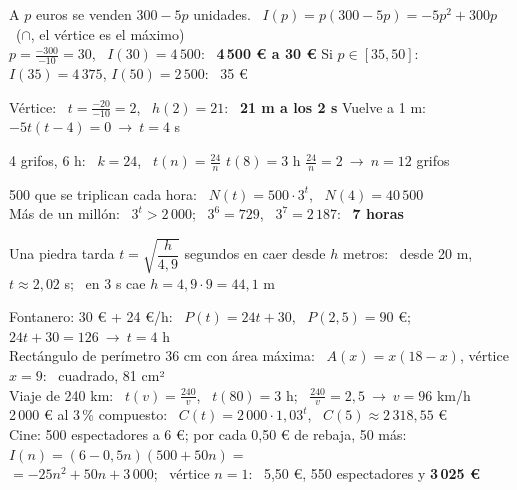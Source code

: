 \documentclass[11pt,a4paper]{article}
\begin{document}
\vfill
\begin{exemple}
A $p$ euros se venden $300-5p$ unidades. \ $I(p)=p(300-5p)=-5p^2+300p$ \ ($\cap$, el vértice es el máximo)\\[3pt]
$p=\frac{-300}{-10}=30$, \ $I(30)=4\,500$: \ \textbf{4\,500 € a 30 €} \qquad Si $p\in[35,50]$: \ $I(35)=4\,375$, $I(50)=2\,500$: \ 35 €
\end{exemple}

\vfill
\begin{exemple}[Cuadrática: \ altura de una pelota \ $h(t)=-5t^2+20t+1$]
Vértice: \ $t=\frac{-20}{-10}=2$, \ $h(2)=21$: \ \textbf{21 m a los 2 s} \qquad Vuelve a 1 m: \ $-5t(t-4)=0\ \to\ t=4$ s
\end{exemple}

\newpage
\begin{exemple}
4 grifos, 6 h: \ $k=24$, \ $t(n)=\frac{24}{n}$ \qquad $t(8)=3$ h \qquad $\frac{24}{n}=2\ \to\ n=12$ grifos
\end{exemple}

\vfill
\begin{exemple}
500 que se triplican cada hora: \ $N(t)=500\cdot3^t$, \ $N(4)=40\,500$\\[3pt]
Más de un millón: \ $3^t>2\,000$; \ $3^6=729$, \ $3^7=2\,187$: \ \textbf{7 horas}
\end{exemple}

\vfill
\begin{exemple}
Una piedra tarda $t=\sqrt{\dfrac{h}{4{,}9}}$ segundos en caer desde $h$ metros: \ desde 20 m, \ $t\approx2{,}02$ s; \ en 3 s cae $h=4{,}9\cdot9=44{,}1$ m
\end{exemple}

\vfill
\begin{exemple}
Fontanero: 30 € + 24 €/h: \ $P(t)=24t+30$, \ $P(2{,}5)=90$ €; \ $24t+30=126\ \to\ t=4$ h\\[4pt]
Rectángulo de perímetro 36 cm con área máxima: \ $A(x)=x(18-x)$, vértice $x=9$: \ cuadrado, 81 cm²\\[4pt]
Viaje de 240 km: \ $t(v)=\frac{240}{v}$, \ $t(80)=3$ h; \ $\frac{240}{v}=2{,}5\ \to\ v=96$ km/h\\[4pt]
2\,000 € al 3\,\% compuesto: \ $C(t)=2\,000\cdot1{,}03^t$, \ $C(5)\approx2\,318{,}55$ €\\[4pt]
Cine: 500 espectadores a 6 €; por cada 0,50 € de rebaja, 50 más: \ $I(n)=(6-0{,}5n)(500+50n)=$\\ \hspace*{1em}$=-25n^2+50n+3\,000$; \ vértice $n=1$: \ 5,50 €, 550 espectadores y \textbf{3\,025 €}
\end{exemple}
\end{document}
